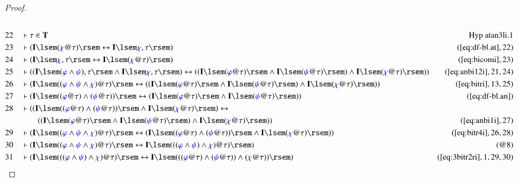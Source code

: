 \begin{proof}
\begin{align}
  \\ 22 &&  & \vdash \tau \in
      \mathbf{T}&\text{Hyp~atan3li.1}\notag%
  \\ 23 &&  & \vdash ( \mathbf{I} \lsem ( \mw{\chi} @ \tau ) \rsem
      \leftrightarrow \mathbf{I} \lsem \mw{\chi} , \tau
      \rsem )&(\mbox{\ref{eq:df-bl.at}},22)\notag
  \\ 24 &&  & \vdash ( \mathbf{I} \lsem \mw{\chi} , \tau \rsem \leftrightarrow
      \mathbf{I} \lsem ( \mw{\chi} @ \tau ) \rsem
      )&(\mbox{\ref{eq:bicomi}},23)\notag
  \\ 25 &&  & \vdash ( ( \mathbf{I} \lsem ( \mw{\varphi} \wedge \mw{\psi} ) ,
      \tau \rsem \wedge \mathbf{I} \lsem \mw{\chi} , \tau
      \rsem ) \leftrightarrow ( ( \mathbf{I} \lsem (
      \mw{\varphi} @ \tau ) \rsem \wedge \mathbf{I} \lsem (
      \mw{\psi} @ \tau ) \rsem ) \wedge \mathbf{I} \lsem (
      \mw{\chi} @ \tau ) \rsem )
      )&(\mbox{\ref{eq:anbi12i}},21,24)\notag
  \\ 26 &&  & \vdash ( \mathbf{I} \lsem ( ( \mw{\varphi} \wedge \mw{\psi}
      \wedge \mw{\chi} ) @ \tau ) \rsem \leftrightarrow ( (
      \mathbf{I} \lsem ( \mw{\varphi} @ \tau ) \rsem \wedge
      \mathbf{I} \lsem ( \mw{\psi} @ \tau ) \rsem ) \wedge
      \mathbf{I} \lsem ( \mw{\chi} @ \tau ) \rsem )
      )&(\mbox{\ref{eq:bitri}},13,25)\notag
  \\ 27 &&  & \vdash ( \mathbf{I} \lsem ( ( \mw{\varphi} @ \tau ) \wedge (
      \mw{\psi} @ \tau ) ) \rsem \leftrightarrow (
      \mathbf{I} \lsem ( \mw{\varphi} @ \tau ) \rsem \wedge
      \mathbf{I} \lsem ( \mw{\psi} @ \tau ) \rsem )
      )&(\mbox{\ref{eq:df-bl.an}})\notag
  \\ 28 &&  & \vdash ( ( \mathbf{I} \lsem ( ( \mw{\varphi} @ \tau ) \wedge (
      \mw{\psi} @ \tau ) ) \rsem \wedge \mathbf{I} \lsem (
      \mw{\chi} @ \tau ) \rsem ) \leftrightarrow \notag \\ & & & \qquad
       ( (
      \mathbf{I} \lsem ( \mw{\varphi} @ \tau ) \rsem \wedge
      \mathbf{I} \lsem ( \mw{\psi} @ \tau ) \rsem ) \wedge
      \mathbf{I} \lsem ( \mw{\chi} @ \tau ) \rsem )
      )&(\mbox{\ref{eq:anbi1i}},27)\notag
  \\ 29 &&  & \vdash ( \mathbf{I} \lsem ( ( \mw{\varphi} \wedge \mw{\psi}
      \wedge \mw{\chi} ) @ \tau ) \rsem \leftrightarrow (
      \mathbf{I} \lsem ( ( \mw{\varphi} @ \tau ) \wedge (
      \mw{\psi} @ \tau ) ) \rsem \wedge \mathbf{I} \lsem (
      \mw{\chi} @ \tau ) \rsem )
      )&(\mbox{\ref{eq:bitr4i}},26,28)\notag
  \\ 30 &&  & \vdash ( \mathbf{I} \lsem ( ( \mw{\varphi} \wedge \mw{\psi}
      \wedge \mw{\chi} ) @ \tau ) \rsem \leftrightarrow
      \mathbf{I} \lsem ( ( ( \mw{\varphi} \wedge \mw{\psi}
      ) \wedge \mw{\chi} ) @ \tau ) \rsem )&(@8)\notag
  \\ 31 &&  & \vdash ( \mathbf{I} \lsem ( ( ( \mw{\varphi} \wedge \mw{\psi} )
      \wedge \mw{\chi} ) @ \tau ) \rsem \leftrightarrow
      \mathbf{I} \lsem ( ( ( \mw{\varphi} @ \tau ) \wedge (
      \mw{\psi} @ \tau ) ) \wedge ( \mw{\chi} @ \tau ) )
      \rsem )&(\mbox{\ref{eq:3bitr2ri}},1,29,30)\notag
\end{align}
\end{proof}

